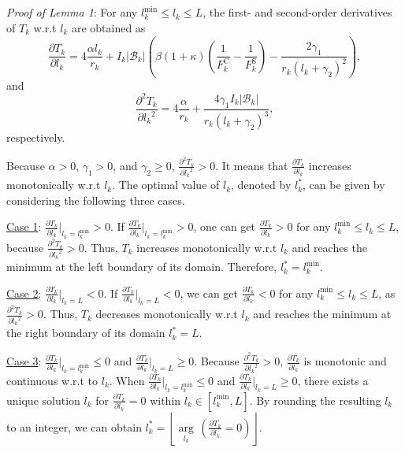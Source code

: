 \documentclass[10pt,journal,transmag]{IEEEtran}
\begin{document}
\begin{appendices}
\section{}
    \label{appendix:proof of lemma: optimal cut-layer}
\textit{Proof of Lemma 1}: For any $l_k^\text{min} \leqslant l_k \leqslant L$, the first- and second-order derivatives of $T_k$ w.r.t $l_k$ are obtained as
\begin{equation}
    \frac{\partial T_k}{\partial l_k} = 4\frac{\alpha l_k}{r_k} + I_k \left|\mathcal{B}_k\right| \left( \beta(1+\kappa)\left(\frac{1}{F_k^\text{C}} - \frac{ 1 }{F_k^\text{S}}\right) - \frac{2\gamma_1}{r_k \left(l_k+\gamma_2\right)^2} \right),
\end{equation} 
and
\begin{equation}
   \frac{\partial^2 T_k}{\partial {l_k}^2} = 4\frac{\alpha}{r_k} +  \frac{4\gamma_1 I_k \left|\mathcal{B}_k\right|}{r_k \left(l_k+\gamma_2\right)^3},
\end{equation}
respectively.

Because $\alpha>0$, $\gamma_1 > 0$, and $\gamma_2 \geqslant 0$, $\frac{\partial^2 T_k}{\partial {l_k}^2}>0$. It means that $\frac{\partial T_k}{\partial l_k}$ increases monotonically w.r.t $l_k$.
The optimal value of $l_k$, denoted by $l^*_k$, can be given by considering the following three cases.

\underline{Case 1}: $\frac{\partial T_{k}}{\partial l_k} \big|_{l_k = l_k^\text{min}} > 0$. If $\frac{\partial T_{k}}{\partial l_k} \big|_{l_k = l_k^\text{min}} > 0$, one can get $\frac{\partial T_k}{\partial l_k}>0$ for any $l_k^\text{min} \leqslant l_k \leqslant L$, because $\frac{\partial^2 T_k}{\partial {l_k}^2}>0$. 
    Thus, $T_k$ increases monotonically w.r.t $l_k$ and reaches the minimum at the left boundary of its domain. Therefore, $l^*_k=l_k^\text{min}$.

\underline{Case 2}: $\frac{\partial T_{k}}{\partial l_k} \big|_{l_k = L} < 0$. If $\frac{\partial T_{k}}{\partial l_k} \big|_{l_k = L} < 0$, we can get $\frac{\partial T_k}{\partial l_k}<0$ for any $l_k^\text{min} \leqslant l_k \leqslant L$, as $\frac{\partial^2 T_k}{\partial {l_k}^2}>0$. 
Thus, $T_k$ decreases monotonically w.r.t $l_k$ and reaches the minimum at the right boundary of its domain $l^*_k=L$.
    
\underline{Case 3}: $\frac{\partial T_{k}}{\partial l_k} \big|_{l_k = l_k^\text{min}} \leqslant 0$ and $\frac{\partial T_{k}}{\partial l_k} \big|_{l_k = L} \geqslant 0$. Because $\frac{\partial^2 T_k}{\partial {l_k}^2}>0$, $\frac{\partial T_{k}}{\partial l_k} $ is monotonic and continuous w.r.t to $l_k$. When $\frac{\partial T_{k}}{\partial l_k} \big|_{l_k = l_k^\text{min}} \leqslant 0$ and $\frac{\partial T_{k}}{\partial l_k} \big|_{l_k = L} \geqslant 0$, there exists a unique solution $l_k$ for $\frac{\partial T_{k}}{\partial l_k} = 0$ within $l_k \in [l_k^\text{min}, L]$. By rounding the resulting $l_k$ to an integer, we can obtain $l^*_k={ \left \lfloor  \underset{l_k}{\operatorname{arg}}\, \left(\frac{\partial T_{k}}{\partial l_k}=0 \right) \right \rfloor  }.$ 


\end{appendices}
\end{document}
